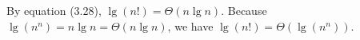 By equation (3.28), $\lg(n!)=\Theta(n\lg n)$.
Because $\lg(n^n)=n\lg n=\Theta(n\lg n)$, we have $\lg(n!)=\Theta(\lg(n^n))$.
